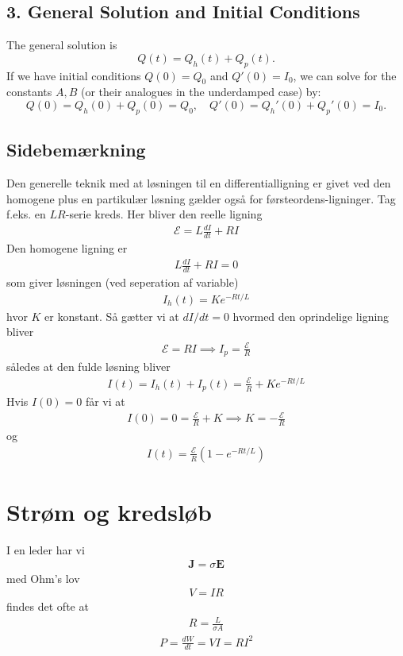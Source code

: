 \documentclass[a4paper]{article}
\begin{document}
    \subsection*{3. General Solution and Initial Conditions}
    The general solution is
    \[
    Q(t) = Q_h(t) + Q_p(t).
    \]
    If we have initial conditions $Q(0) = Q_0$ and $Q'(0) = I_0$, we can solve for 
    the constants $A, B$ (or their analogues in the underdamped case) by:
    \[
    Q(0) = Q_h(0) + Q_p(0) = Q_0, \quad Q'(0) = Q_h'(0) + Q_p'(0) = I_0.
    \]

    \subsection*{Sidebemærkning}
    Den generelle teknik med at løsningen til en differentialligning er givet ved den homogene plus en partikulær løsning gælder også for førsteordens-ligninger. Tag f.eks. en \(LR\)-serie kreds. Her bliver den reelle ligning \begin{align*}
        \mathcal{E} = L \frac{dI}{dt} + RI
    \end{align*}
    Den homogene ligning er \begin{align*}
        L \frac{dI}{dt} + RI = 0
    \end{align*}
    som giver løsningen (ved seperation af variable) \begin{align*}
        I_h(t) = Ke^{-Rt/L}
    \end{align*}
    hvor \(K\) er konstant. Så gætter vi at \(d I / dt = 0\) hvormed den oprindelige ligning bliver \begin{align*}
        \mathcal{E} = RI \implies I_p = \frac{\mathcal{E}}{R}
    \end{align*}  
    således at den fulde løsning bliver \begin{align*}
        I(t) = I_h(t) + I_p(t) = \frac{\mathcal{E}}{R} + Ke^{-Rt/L}
    \end{align*}
    Hvis \(I(0) = 0\) får vi at \begin{align*}
        I(0) = 0 = \frac{\mathcal{E}}{R} + K \implies K = - \frac{\mathcal{E}}{R}
    \end{align*} 
    og \begin{align*}
        I(t) = \frac{\mathcal{E}}{R} \left( 1 - e^{-Rt/L} \right)  \tag{K(35)}
    \end{align*}

    \newpage
    \section{Strøm og kredsløb}
    I en leder har vi \begin{align*}
        \mathbf{J} = \sigma \mathbf{E} \tag{K(2)}
    \end{align*}
    med Ohm's lov \begin{align*}
        \boxed{V = IR} \tag{K(5)}
    \end{align*}
    findes det ofte at \begin{align*}
        R = \frac{L}{\sigma A}
    \end{align*}
    \begin{align*}
        \boxed{P = \frac{dW}{dt} = VI = R I^{2} } \tag{K(7)}
    \end{align*}
\end{document}
